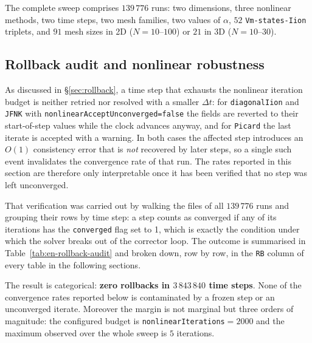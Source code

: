 \documentclass[11pt,a4paper]{article}
\newcommand{\code}[1]{\texttt{\small #1}}
\begin{document}
The complete sweep comprises $139\,776$ runs: two dimensions, three nonlinear
methods, two time steps, two mesh families, two values of $\alpha$, $52$
\code{Vm-states-Iion} triplets, and $91$ mesh sizes in 2D ($N=10$--$100$) or
$21$ in 3D ($N=10$--$30$).

\subsection{Rollback audit and nonlinear robustness}
\label{sec:en-rollback-audit}

As discussed in \S\ref{sec:rollback}, a time step that exhausts the nonlinear
iteration budget is neither retried nor resolved with a smaller $\Delta t$: for
\code{diagonalIion} and \code{JFNK} with
\code{nonlinearAcceptUnconverged=false} the fields are reverted to their
start-of-step values while the clock advances anyway, and for \code{Picard} the
last iterate is accepted with a warning. In both cases the affected step
introduces an $O(1)$ consistency error that is \emph{not} recovered by later
steps, so a single such event invalidates the convergence rate of that run. The
rates reported in this section are therefore only interpretable once it has been
verified that no step was left unconverged.

That verification was carried out by walking the
 files of all
$139\,776$ runs and grouping their rows by time step: a step counts as converged
if any of its iterations has the \code{converged} flag set to 1, which is
exactly the condition under which the solver breaks out of the corrector loop.
The outcome is summarised in Table~\ref{tab:en-rollback-audit} and broken down,
row by row, in the \code{RB} column of every table in the following sections.



\FloatBarrier

The result is categorical: \textbf{zero rollbacks in $3\,843\,840$ time steps}.
None of the convergence rates reported below is contaminated by a frozen step or
an unconverged iterate. Moreover the margin is not marginal but three orders of
magnitude: the configured budget is \code{nonlinearIterations}$=2000$ and the
maximum observed over the whole sweep is $5$ iterations.
\end{document}
